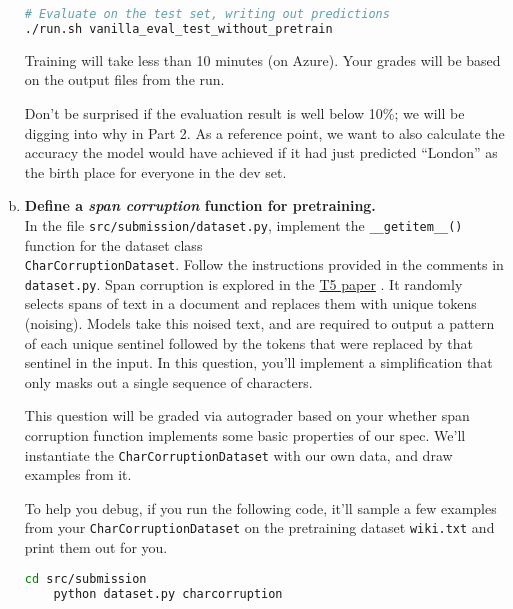 \begin{enumerate}[(a)]
\begin{lstlisting}[language=bash]
# Evaluate on the test set, writing out predictions
./run.sh vanilla_eval_test_without_pretrain
\end{lstlisting}

Training will take less than 10 minutes (on Azure). Your grades will be based on the output files from the run.

Don't be surprised if the evaluation result is well below 10\%; we will be digging into why in Part 2. As a reference point, we want to also calculate the accuracy the model would have achieved if it had just predicted ``London'' as the birth place for everyone in the dev set. 


\item {}  \textbf{Define a \textit{span corruption} function for pretraining.}\\
In the file \texttt{src/submission/dataset.py}, implement the \texttt{\_\_getitem\_\_()} function for the dataset class \\
\texttt{CharCorruptionDataset}.
Follow the instructions provided in the comments in \texttt{dataset.py}.
Span corruption is explored in the \href{https://arxiv.org/pdf/1910.10683.pdf}{T5 paper} \cite{raffel2020exploring}.
It randomly selects spans of text in a document and replaces them with unique tokens (noising).
Models take this noised text, and are required to output a pattern of each unique sentinel followed by the tokens that were replaced by that sentinel in the input.
In this question, you'll implement a simplification that only masks out a single sequence of characters.

This question will be graded via autograder based on your whether span corruption function implements some basic properties of our spec.
We'll instantiate the \texttt{CharCorruptionDataset} with our own data, and draw examples from it.

To help you debug, if you run the following code, it'll sample a few examples from your \texttt{CharCorruptionDataset} on the pretraining dataset \texttt{wiki.txt} and print them out for you.
\begin{lstlisting}[language=bash]
    cd src/submission
    python dataset.py charcorruption
\end{lstlisting}


\end{enumerate}
